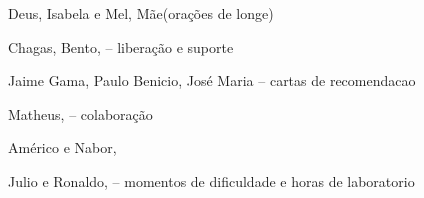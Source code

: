 \begin{agradecimentos}
Deus, Isabela e Mel, Mãe(orações de longe)
 
Chagas, Bento, -- liberação e suporte

Jaime Gama, Paulo Benicio, José Maria -- cartas de recomendacao

Matheus, -- colaboração

Américo e Nabor,

Julio e Ronaldo, -- momentos de dificuldade e horas de laboratorio

\end{agradecimentos}
